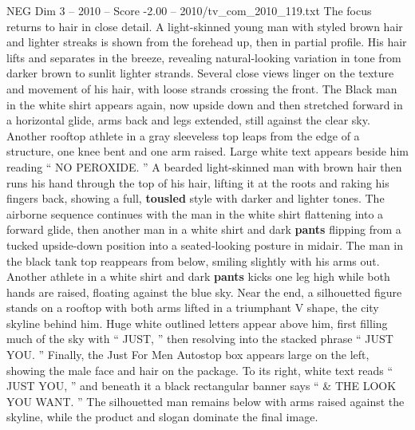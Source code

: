 \begin{textsample}{NEG Dim 3 – 2010 – Score -2.00 – 2010/tv\_com\_2010\_119.txt}
The focus returns to hair in close detail.
A light-skinned young man with styled brown hair and lighter streaks is shown from the forehead up, then in partial profile.
His hair lifts and separates in the breeze, revealing natural-looking variation in tone from darker brown to sunlit lighter strands.
Several close views linger on the texture and movement of his hair, with loose strands crossing the front.
The Black man in the white shirt appears again, now upside down and then stretched forward in a horizontal glide, arms back and legs extended, still against the clear sky.
Another rooftop athlete in a gray sleeveless top leaps from the edge of a structure, one knee bent and one arm raised.
Large white text appears beside him reading “ NO PEROXIDE. ” A bearded light-skinned man with brown hair then runs his hand through the top of his hair, lifting it at the roots and raking his fingers back, showing a full, \textbf{tousled} style with darker and lighter tones.
The airborne sequence continues with the man in the white shirt flattening into a forward glide, then another man in a white shirt and dark \textbf{pants} flipping from a tucked upside-down position into a seated-looking posture in midair.
The man in the black tank top reappears from below, smiling slightly with his arms out.
Another athlete in a white shirt and dark \textbf{pants} kicks one leg high while both hands are raised, floating against the blue sky.
Near the end, a silhouetted figure stands on a rooftop with both arms lifted in a triumphant V shape, the city skyline behind him.
Huge white outlined letters appear above him, first filling much of the sky with “ JUST, ” then resolving into the stacked phrase “ JUST YOU. ” Finally, the Just For Men Autostop box appears large on the left, showing the male face and hair on the package.
To its right, white text reads “ JUST YOU, ” and beneath it a black rectangular banner says “ \& THE LOOK YOU WANT. ” The silhouetted man remains below with arms raised against the skyline, while the product and slogan dominate the final image.

\end{textsample}

